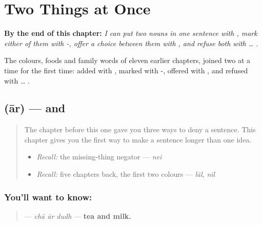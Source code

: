 
\chapter{Two Things at Once}
\label{ch:bn-two-things-at-once}

\begin{chapteropening}
\textbf{By the end of this chapter:} \emph{I can put two nouns in one sentence with , mark either of them with -, offer a choice between them with , and refuse both with  … .}

The colours, foods and family words of eleven earlier chapters, joined two at a time for the first time: added with , marked with -, offered with , and refused with  … .
\end{chapteropening}

\section[\texorpdfstring{\bn{আর} (ār)}{আর (ār)}]{ (ār) — and}

\label{lesson:BN-C17-ar}



\begin{quote}
The chapter before this one gave you three ways to deny a sentence. This chapter gives you the first way to make a sentence longer than one idea.

\begin{itemize}
\raggedright
  \item \emph{Recall:} the missing-thing negator — \emph{nei}
  \item \emph{Recall:} five chapters back, the first two colours — \emph{lāl}, \emph{nīl}
\end{itemize}
\end{quote}

\subsection*{You'll want to know: }
\begin{quote}
\textbf{  } — \emph{chā ār dudh} — \textbf{tea and milk.}
\end{quote}

